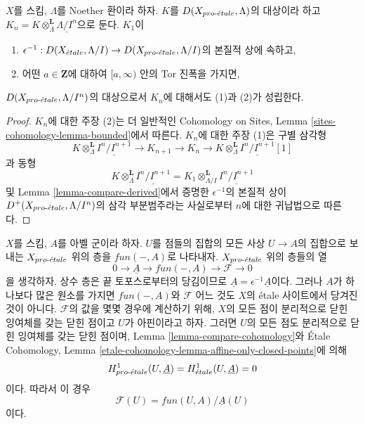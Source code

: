 \begin{lemma}
\label{lemma-compare-truncations}
$X$를 스킴, $\Lambda$를 Noether 환이라 하자.
$K$를 $D(X_{pro\text{-}\acute{e}tale}, \Lambda)$의 대상이라 하고
$K_n = K \otimes_\Lambda^\mathbf{L} \underline{\Lambda/I^n}$으로 둔다.
$K_1$이
\begin{enumerate}
\item $\epsilon^{-1} :D(X_{\acute{e}tale}, \Lambda/I) \to
D(X_{pro\text{-}\acute{e}tale}, \Lambda/I)$의 본질적 상에 속하고,
\item 어떤 $a \in \mathbf{Z}$에 대하여 $[a,\infty)$ 안의 Tor 진폭을
가지면,
\end{enumerate}
$D(X_{pro\text{-}\acute{e}tale}, \Lambda/I^n)$의 대상으로서 $K_n$에 대해서도 (1)과
(2)가 성립한다.
\end{lemma}

\begin{proof}
$K_n$에 대한 주장 (2)는 더 일반적인 Cohomology on Sites, Lemma
\ref{sites-cohomology-lemma-bounded}에서 따른다. $K_n$에 대한 주장
(1)은 구별 삼각형
$$
K \otimes_\Lambda^\mathbf{L} \underline{I^n/I^{n + 1}} \to
K_{n + 1} \to
K_n \to
K \otimes_\Lambda^\mathbf{L} \underline{I^n/I^{n + 1}}[1]
$$
과 동형
$$
K \otimes_\Lambda^\mathbf{L} \underline{I^n/I^{n + 1}} =
K_1 \otimes_{\Lambda/I}^\mathbf{L} \underline{I^n/I^{n + 1}}
$$
및 Lemma \ref{lemma-compare-derived}에서 증명한 $\epsilon^{-1}$의
본질적 상이 $D^+(X_{pro\text{-}\acute{e}tale}, \Lambda/I^n)$의 삼각 부분범주라는
사실로부터 $n$에 대한 귀납법으로 따른다.
\end{proof}

\begin{example}
\label{example-functions-mod-locally-constant-functions}
$X$를 스킴, $A$를 아벨 군이라 하자. $U$를 점들의 집합의 모든 사상
$U \to A$의 집합으로 보내는 $X_{pro\text{-}\acute{e}tale}$ 위의 층을
$fun(-, A)$로 나타내자. $X_{pro\text{-}\acute{e}tale}$ 위의 층들의 열
$$
0 \to \underline{A} \to fun(-, A) \to \mathcal{F} \to 0
$$
을 생각하자. 상수 층은 끝 토포스로부터의 당김이므로
$\underline{A} = \epsilon^{-1}\underline{A}$이다.
그러나 $A$가 하나보다 많은 원소를 가지면 $fun(-, A)$와
$\mathcal{F}$ 어느 것도 $X$의 \'etale 사이트에서 당겨진 것이 아니다.
$\mathcal{F}$의 값을 몇몇 경우에 계산하기 위해, $X$의 모든 점이
분리적으로 닫힌 잉여체를 갖는 닫힌 점이고 $U$가 아핀이라고 하자.
그러면 $U$의 모든 점도 분리적으로 닫힌 잉여체를 갖는 닫힌 점이며,
Lemma \ref{lemma-compare-cohomology}와 \'Etale Cohomology, Lemma
\ref{etale-cohomology-lemma-affine-only-closed-points}에 의해
$$
H^1_{pro\text{-}\acute{e}tale}(U, \underline{A}) =
H^1_{\acute{e}tale}(U, \underline{A}) = 0
$$
이다. 따라서 이 경우
$$
\mathcal{F}(U) = fun(U, A)/\underline{A}(U)
$$
이다.
\end{example}





